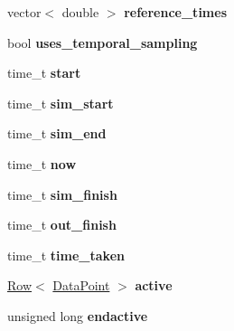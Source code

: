 \begin{DoxyCompactItemize}
\item 
vector$<$ double $>$ {\bfseries reference\+\_\+times}\hypertarget{class_tree_a56bb1ea64368f5b705360a435350f9d5}{}\label{class_tree_a56bb1ea64368f5b705360a435350f9d5}

\item 
bool {\bfseries uses\+\_\+temporal\+\_\+sampling}\hypertarget{class_tree_abed1688c75153c4af4e8c574a26dd636}{}\label{class_tree_abed1688c75153c4af4e8c574a26dd636}

\item 
time\+\_\+t {\bfseries start}\hypertarget{class_tree_ac077d686ee96b123aa779e8a8a5de3ce}{}\label{class_tree_ac077d686ee96b123aa779e8a8a5de3ce}

\item 
time\+\_\+t {\bfseries sim\+\_\+start}\hypertarget{class_tree_a01cc9b30f2b10b9f51b218df25b13b09}{}\label{class_tree_a01cc9b30f2b10b9f51b218df25b13b09}

\item 
time\+\_\+t {\bfseries sim\+\_\+end}\hypertarget{class_tree_a26100477c7e58a9e0a90cdee1379ed69}{}\label{class_tree_a26100477c7e58a9e0a90cdee1379ed69}

\item 
time\+\_\+t {\bfseries now}\hypertarget{class_tree_a5510d0fb5deb23fd39a2619d104f85fa}{}\label{class_tree_a5510d0fb5deb23fd39a2619d104f85fa}

\item 
time\+\_\+t {\bfseries sim\+\_\+finish}\hypertarget{class_tree_ac399ba59be9dc33a04223d10a82ee5ee}{}\label{class_tree_ac399ba59be9dc33a04223d10a82ee5ee}

\item 
time\+\_\+t {\bfseries out\+\_\+finish}\hypertarget{class_tree_a5ee1fa5adf72bb599badc041fbee7d09}{}\label{class_tree_a5ee1fa5adf72bb599badc041fbee7d09}

\item 
time\+\_\+t {\bfseries time\+\_\+taken}\hypertarget{class_tree_abd18bb487c0192588b6bed6f00bcfd07}{}\label{class_tree_abd18bb487c0192588b6bed6f00bcfd07}

\item 
\hyperlink{class_row}{Row}$<$ \hyperlink{class_data_point}{Data\+Point} $>$ {\bfseries active}\hypertarget{class_tree_a047b331de4979aa4713c69f09237ac35}{}\label{class_tree_a047b331de4979aa4713c69f09237ac35}

\item 
unsigned long {\bfseries endactive}\hypertarget{class_tree_ab478831f09c135bc9a4bc991c9fd5076}{}\label{class_tree_ab478831f09c135bc9a4bc991c9fd5076}


\end{DoxyCompactItemize}
